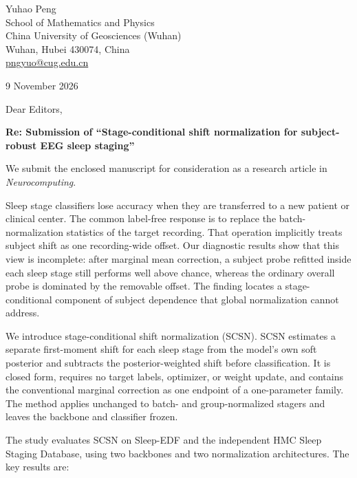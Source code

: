 \documentclass[10pt]{letter}
\begin{document}
\pagestyle{empty}

\begin{flushright}
Yuhao Peng\\
School of Mathematics and Physics\\
China University of Geosciences (Wuhan)\\
Wuhan, Hubei 430074, China\\
\href{mailto:pngyuo@cug.edu.cn}{pngyuo@cug.edu.cn}
\end{flushright}

\vspace{0.5em}
9 November 2026

\vspace{0.5em}
Dear Editors,

\textbf{Re: Submission of ``Stage-conditional shift normalization for
subject-robust EEG sleep staging''}

We submit the enclosed manuscript for consideration as a research article in
\emph{Neurocomputing}.

Sleep stage classifiers lose accuracy when they are transferred to a new
patient or clinical center. The common label-free response is to replace the
batch-normalization statistics of the target recording. That operation
implicitly treats subject shift as one recording-wide offset. Our diagnostic
results show that this view is incomplete: after marginal mean correction, a
subject probe refitted inside each sleep stage still performs well above
chance, whereas the ordinary overall probe is dominated by the removable
offset. The finding locates a stage-conditional component of subject
dependence that global normalization cannot address.

We introduce stage-conditional shift normalization (SCSN). SCSN estimates a
separate first-moment shift for each sleep stage from the model's own soft
posterior and subtracts the posterior-weighted shift before classification.
It is closed form, requires no target labels, optimizer, or weight update, and
contains the conventional marginal correction as one endpoint of a
one-parameter family. The method applies unchanged to batch- and
group-normalized stagers and leaves the backbone and classifier frozen.

The study evaluates SCSN on Sleep-EDF and the independent HMC Sleep Staging
Database, using two backbones and two normalization architectures. The key
results are:
\end{document}
